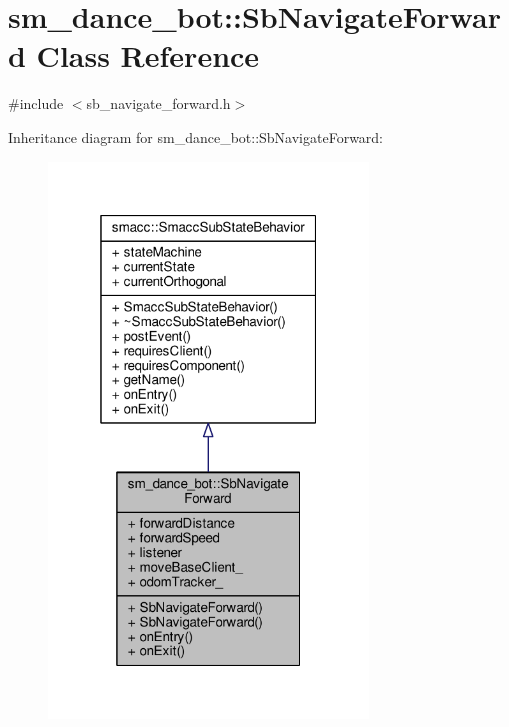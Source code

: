 \hypertarget{classsm__dance__bot_1_1SbNavigateForward}{}\section{sm\+\_\+dance\+\_\+bot\+:\+:Sb\+Navigate\+Forward Class Reference}
\label{classsm__dance__bot_1_1SbNavigateForward}


{\ttfamily \#include $<$sb\+\_\+navigate\+\_\+forward.\+h$>$}



Inheritance diagram for sm\+\_\+dance\+\_\+bot\+:\+:Sb\+Navigate\+Forward\+:
\nopagebreak
\begin{figure}[H]
\begin{center}
\leavevmode
\includegraphics[width=241pt]{classsm__dance__bot_1_1SbNavigateForward__inherit__graph}
\end{center}
\end{figure}


